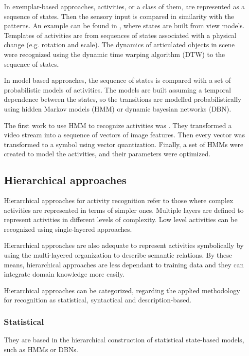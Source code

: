 In exemplar-based approaches, activities, or a class of them, are represented as a sequence of states. 
Then the sensory input is compared in similarity with the patterns.
An example can be found in \citep{Darrell1993_STGestures}, where states are built from view models.
Templates of activities are from sequences of states associated with a physical change (e.g. rotation and scale).
The dynamics of articulated objects in scene were recognized using the dynamic time warping algorithm (DTW) to the sequence of states.

In model based approaches, the sequence of states is compared with a set of probabilistic models of activities. The models are built assuming a temporal dependence between the states, so the transitions are modelled probabilistically using hidden Markov models (HMM) or dynamic bayesian networks (DBN).

The first work to use HMM to recognize activities was \citep{Yamato1992_RecHA_HMM}. They transformed a video stream into a sequence of vectors of image features. Then every vector was transformed to a symbol using vector quantization. Finally, a set of HMMs were created to model the activities, and their parameters were optimized. 


\subsection{Hierarchical approaches}
Hierarchical approaches for activity recognition refer to those where complex activities are represented in terms of simpler ones. 
Multiple layers are defined to represent activities in different levels of complexity.
Low level activities can be recognized using single-layered approaches. 

Hierarchical approaches are also adequate to represent activities symbolically by using the multi-layered organization to describe semantic relations.
By these means, hierarchical approaches are less dependant to training data and they can integrate domain knowledge more easily.

Hierarchical approaches can be categorized, regarding the applied methodology for recognition as statistical, syntactical and description-based. %


\subsubsection{Statistical}
They are based in the hierarchical construction of statistical state-based models, such as HMMs or DBNs.


